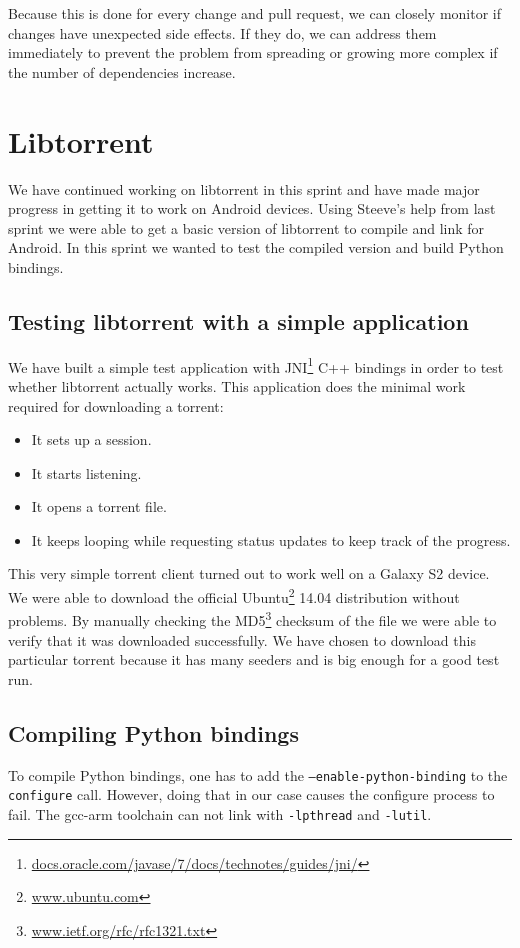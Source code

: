 		Because this is done for every change and pull request, we can closely monitor if changes have unexpected side effects. If they do, we can address them immediately to prevent the problem from spreading or growing more complex if the number of dependencies increase.
		
	
	\section{Libtorrent}
		We have continued working on libtorrent in this sprint and have made major progress in getting it to work on Android devices. Using Steeve's help from last sprint we were able to get a basic version of libtorrent to compile and link for Android. In this sprint we wanted to test the compiled version and build Python bindings.
		
		\subsection{Testing libtorrent with a simple application}
			We have built a simple test application with JNI\footnote{\href{http://docs.oracle.com/javase/7/docs/technotes/guides/jni/}{docs.oracle.com/javase/7/docs/technotes/guides/jni/}} C++ bindings in order to test whether libtorrent actually works. This application does the minimal work required for downloading a torrent:
			\begin{itemize}
				\item It sets up a session.
				\item It starts listening.
				\item It opens a torrent file.
				\item It keeps looping while requesting status updates to keep track of the progress.
			\end{itemize}
			This very simple torrent client turned out to work well on a Galaxy S2 device. We were able to download the official Ubuntu\footnote{\href{http://www.ubuntu.com}{www.ubuntu.com}} 14.04 distribution without problems. By manually checking the MD5\footnote{\href{http://www.ietf.org/rfc/rfc1321.txt}{www.ietf.org/rfc/rfc1321.txt}} checksum of the file we were able to verify that it was downloaded successfully. We have chosen to download this particular torrent because it has many seeders and is big enough for a good test run.
		
		\subsection{Compiling Python bindings}
			To compile Python bindings, one has to add the \texttt{--enable-python-binding} to the \texttt{configure} call. However, doing that in our case causes the configure process to fail. The gcc-arm toolchain can not link with \texttt{-lpthread} and \texttt{-lutil}.
			
